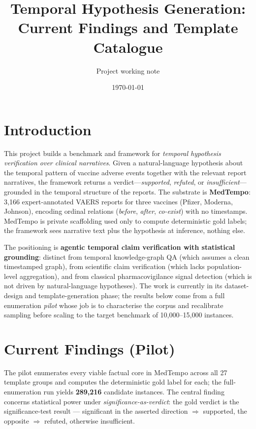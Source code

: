 \documentclass[11pt]{article}
\title{Temporal Hypothesis Generation:\\Current Findings and Template Catalogue}
\author{Project working note}
\date{\today}
\begin{document}
\maketitle

\section{Introduction}
This project builds a benchmark and framework for \emph{temporal hypothesis
verification over clinical narratives}. Given a natural-language hypothesis about the
temporal pattern of vaccine adverse events together with the relevant report narratives,
the framework returns a verdict---\emph{supported}, \emph{refuted}, or \emph{insufficient}---grounded
in the temporal structure of the reports. The substrate is \textbf{MedTempo}: 3{,}166
expert-annotated VAERS reports for three vaccines (Pfizer, Moderna, Johnson), encoding
ordinal relations (\emph{before}, \emph{after}, \emph{co-exist}) with no timestamps.
MedTempo is private scaffolding used only to compute deterministic gold labels; the
framework sees narrative text plus the hypothesis at inference, nothing else.

The positioning is \textbf{agentic temporal claim verification with statistical grounding}:
distinct from temporal knowledge-graph QA (which assumes a clean timestamped graph), from
scientific claim verification (which lacks population-level aggregation), and from classical
pharmacovigilance signal detection (which is not driven by natural-language hypotheses).
The work is currently in its dataset-design and template-generation phase; the results below
come from a full enumeration \emph{pilot} whose job is to characterise the corpus and
recalibrate sampling before scaling to the target benchmark of 10{,}000--15{,}000 instances.
\section{Current Findings (Pilot)}
The pilot enumerates every viable factual core in MedTempo across all 27 template groups and computes the deterministic gold
label for each; the full-enumeration run yields \textbf{289{,}216} candidate instances.
The central finding concerns statistical power under \emph{significance-as-verdict}: the
gold verdict is the significance-test result --- significant in the asserted direction
$\Rightarrow$ supported, the opposite $\Rightarrow$ refuted, otherwise insufficient.
\end{document}
